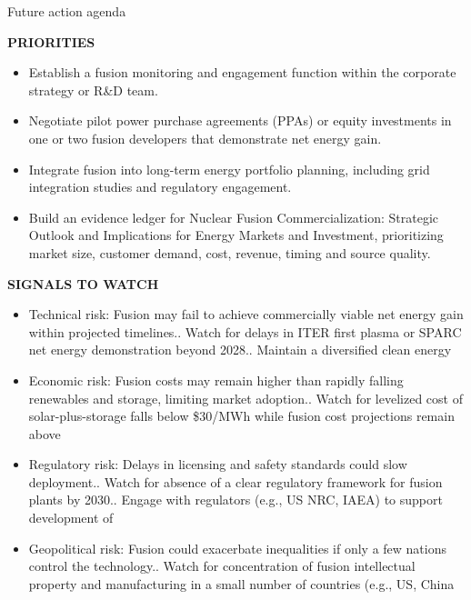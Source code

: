 \documentclass[10pt,a4paper]{article}
\begin{document}
\clearpage
{\sffamily\fontsize{21}{26}\selectfont\color{BONavy} Future action agenda}\par\vspace{7pt}
\begin{minipage}[t]{0.47\linewidth}
{\textcolor{BOGreen}{\scriptsize\bfseries PRIORITIES}}\par\vspace{3pt}
{\small\begin{itemize}
\item Establish a fusion monitoring and engagement function within the corporate strategy or R\&D team.
\item Negotiate pilot power purchase agreements (PPAs) or equity investments in one or two fusion developers that demonstrate net energy gain.
\item Integrate fusion into long-term energy portfolio planning, including grid integration studies and regulatory engagement.
\item Build an evidence ledger for Nuclear Fusion Commercialization: Strategic Outlook and Implications for Energy Markets and Investment, prioritizing market size, customer demand, cost, revenue, timing and source quality.
\end{itemize}}
\end{minipage}\hfill\begin{minipage}[t]{0.45\linewidth}
{\textcolor{BOGreen}{\scriptsize\bfseries SIGNALS TO WATCH}}\par\vspace{3pt}
{\small\begin{itemize}
\item Technical risk: Fusion may fail to achieve commercially viable net energy gain within projected timelines.. Watch for delays in ITER first plasma or SPARC net energy demonstration beyond 2028.. Maintain a diversified clean energy
\item Economic risk: Fusion costs may remain higher than rapidly falling renewables and storage, limiting market adoption.. Watch for levelized cost of solar-plus-storage falls below \$30/MWh while fusion cost projections remain above
\item Regulatory risk: Delays in licensing and safety standards could slow deployment.. Watch for absence of a clear regulatory framework for fusion plants by 2030.. Engage with regulators (e.g., US NRC, IAEA) to support development of
\item Geopolitical risk: Fusion could exacerbate inequalities if only a few nations control the technology.. Watch for concentration of fusion intellectual property and manufacturing in a small number of countries (e.g., US, China
\end{itemize}}
\end{minipage}
\end{document}
